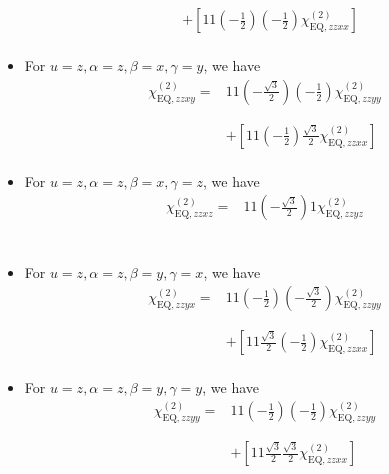 \documentclass[UTF8,10pt,a4paper]{article}
\begin{document}
\begin{itemize}
\begin{align}
\nonumber&\\
\nonumber&+\left[11\left(-\frac{1}{2}\right)\left(-\frac{1}{2}\right)\chi_{\text{EQ},zzxx}^{(2)}\right]\\
&
\end{align}\normalsize
\item For $u=z,\alpha=z,\beta=x,\gamma=y$, we have
\footnotesize\begin{align}
\nonumber\chi_{\text{EQ},zzxy}^{(2)}=&11\left(-\frac{\sqrt{3}}{2}\right)\left(-\frac{1}{2}\right)\chi_{\text{EQ},zzyy}^{(2)}\\
\nonumber&\\
\nonumber&\\
\nonumber&+\left[11\left(-\frac{1}{2}\right)\frac{\sqrt{3}}{2}\chi_{\text{EQ},zzxx}^{(2)}\right]\\
&
\end{align}\normalsize
\item For $u=z,\alpha=z,\beta=x,\gamma=z$, we have
\footnotesize\begin{align}
\nonumber\chi_{\text{EQ},zzxz}^{(2)}=&11\left(-\frac{\sqrt{3}}{2}\right)1\chi_{\text{EQ},zzyz}^{(2)}\\
\nonumber&\\
\nonumber&\\
\nonumber&\\
&
\end{align}\normalsize
\item For $u=z,\alpha=z,\beta=y,\gamma=x$, we have
\footnotesize\begin{align}
\nonumber\chi_{\text{EQ},zzyx}^{(2)}=&11\left(-\frac{1}{2}\right)\left(-\frac{\sqrt{3}}{2}\right)\chi_{\text{EQ},zzyy}^{(2)}\\
\nonumber&\\
\nonumber&\\
\nonumber&+\left[11\frac{\sqrt{3}}{2}\left(-\frac{1}{2}\right)\chi_{\text{EQ},zzxx}^{(2)}\right]\\
&
\end{align}\normalsize
\item For $u=z,\alpha=z,\beta=y,\gamma=y$, we have
\footnotesize\begin{align}
\nonumber\chi_{\text{EQ},zzyy}^{(2)}=&11\left(-\frac{1}{2}\right)\left(-\frac{1}{2}\right)\chi_{\text{EQ},zzyy}^{(2)}\\
\nonumber&\\
\nonumber&\\
\nonumber&+\left[11\frac{\sqrt{3}}{2}\frac{\sqrt{3}}{2}\chi_{\text{EQ},zzxx}^{(2)}\right]\\

\end{align}
\end{itemize}
\end{document}
